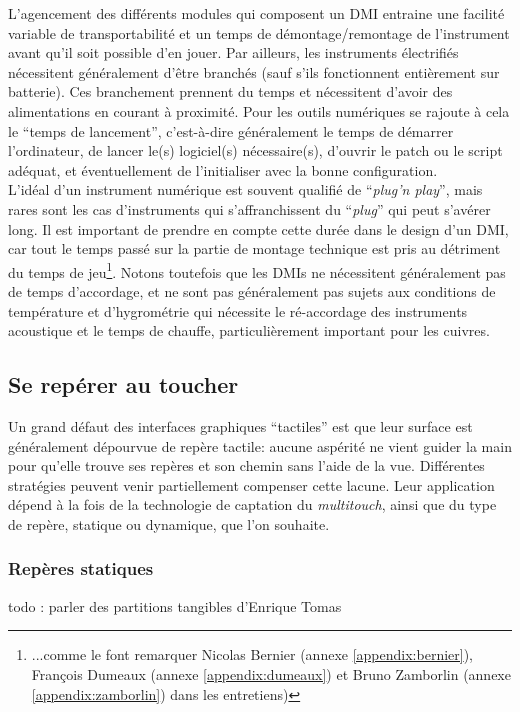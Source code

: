 \noindent L'agencement des différents modules qui composent un \gls{DMI} entraine une facilité variable de transportabilité et un temps de démontage/remontage de l'instrument avant qu'il soit possible d'en jouer. Par ailleurs, les instruments électrifiés nécessitent généralement d'être branchés (sauf s'ils fonctionnent entièrement sur batterie). Ces branchement prennent du temps et nécessitent d'avoir des alimentations en courant à proximité. Pour les outils numériques se rajoute à cela le ``temps de lancement'', c'est-à-dire généralement le temps de démarrer l'ordinateur, de lancer le(s) logiciel(s) nécessaire(s), d'ouvrir le patch ou le script adéquat, et éventuellement de l'initialiser avec la bonne configuration.\\
\indent L'idéal d'un instrument numérique est souvent qualifié de ``\textit{plug'n play}'', mais rares sont les cas d'instruments qui s'affranchissent du ``\textit{plug}'' qui peut s'avérer long. Il est important de prendre en compte cette durée dans le design d'un \gls{DMI}, car tout le temps passé sur la partie de montage technique est pris au détriment du temps de jeu\footnote{...comme le font remarquer Nicolas Bernier (annexe \ref{appendix:bernier}), François Dumeaux (annexe \ref{appendix:dumeaux}) et Bruno Zamborlin (annexe \ref{appendix:zamborlin}) dans les entretiens)}. Notons toutefois que les \glspl{DMI} ne nécessitent généralement pas de temps d'accordage, et ne sont pas généralement pas sujets aux conditions de température et d'hygrométrie qui nécessite le ré-accordage des instruments acoustique et le temps de chauffe, particulièrement important pour les cuivres.


\subsection{Se repérer au toucher}
\indent Un grand défaut des interfaces graphiques ``tactiles'' est que leur surface est généralement dépourvue de repère tactile: aucune aspérité ne vient guider la main pour qu'elle trouve ses repères et son chemin sans l'aide de la vue. Différentes stratégies peuvent venir partiellement compenser cette lacune. Leur application dépend à la fois de la technologie de captation du \textit{multitouch}, ainsi que du type de repère, statique ou dynamique, que l'on souhaite.

\subsubsection{Repères statiques}
todo : parler des partitions tangibles d'Enrique Tomas

